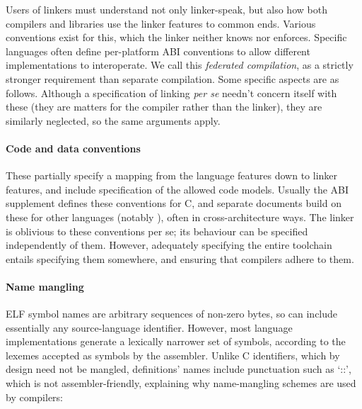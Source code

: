 Users of linkers must understand not only linker-speak, but also 
how both compilers and libraries use the linker features to common ends.
Various conventions exist for this, which the linker neither knows nor enforces.
Specific languages often define per-platform ABI conventions to
allow different implementations to interoperate.
We call this \emph{federated compilation}, as a strictly stronger 
requirement than separate compilation.
Some specific aspects are as follows.
Although a specification of linking \textit{per se} needn't concern itself with these
(they are matters for the compiler rather than the linker), 
they are similarly neglected, so the same arguments apply.

\paragraph{Code and data conventions} 
These partially specify a mapping from the language features down to linker features,
and include specification of the allowed code models.
Usually the ABI supplement defines these conventions for C,
and separate documents build on these for other languages (notably \Cplusplus{}), 
often in cross-architecture ways.
The linker is oblivious to these conventions per se; 
its behaviour can be specified independently of them. 
However, adequately specifying the entire toolchain entails
specifying them somewhere, and ensuring that compilers adhere to them.

\paragraph{Name mangling}
ELF symbol names are arbitrary sequences of non-zero bytes, so can include 
essentially any source-language identifier. However, 
most language implementations generate a lexically narrower set of symbols,
according to the lexemes accepted as symbols by the assembler.
Unlike C identifiers, which by design need not be mangled, 
\Cplusplus{} definitions' names include punctuation such as `\textsf{::}', 
which is not assembler-friendly,
explaining why name-mangling schemes are used by \Cplusplus{} compilers: 

